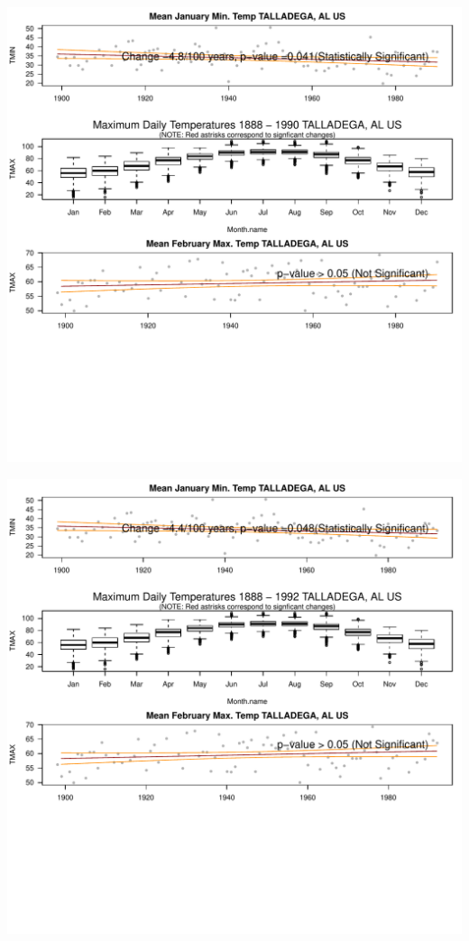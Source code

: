 \documentclass{article}\usepackage[]{graphicx}\usepackage[]{color}
\makeatletter
\def\maxwidth{ %
  \ifdim\Gin@nat@width>\linewidth
    \linewidth
  \else
    \Gin@nat@width
  \fi
}
\newenvironment{knitrout}{}{} %
\makeatother
\begin{document}
\begin{knitrout}
\includegraphics[width=\maxwidth]{figure/static_template-41} 

\includegraphics[width=\maxwidth]{figure/static_template-42} 


\end{knitrout}
\end{document}
